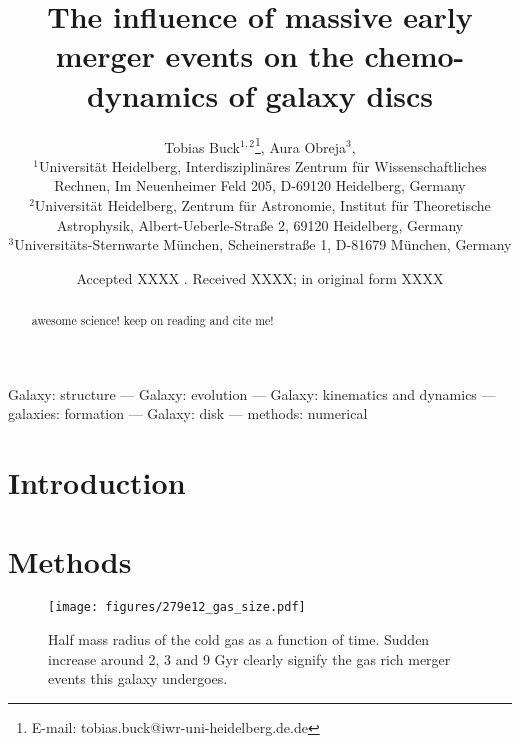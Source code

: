 \documentclass[useAMS,usenatbib]{mnras}
\title[Early massive accretion events in a MW-mass galaxy]{The influence of massive early merger events on the chemo-dynamics of galaxy discs}
\author[T. Buck] {Tobias Buck$^{1,2}$\thanks{E-mail: tobias.buck@iwr-uni-heidelberg.de.de}, Aura Obreja$^{3}$, \etal \\  %
%
$^1$Universit\"at Heidelberg, Interdisziplin\"ares Zentrum f\"ur Wissenschaftliches Rechnen, Im Neuenheimer Feld 205, D-69120 Heidelberg, Germany\\
$^2$Universit\"at Heidelberg, Zentrum f\"ur Astronomie, Institut f\"ur Theoretische Astrophysik, Albert-Ueberle-Straße 2, 69120 Heidelberg, Germany\\
$^3$Universit\"ats-Sternwarte M\"unchen, Scheinerstraße 1, D-81679 M\"unchen, Germany%
}
\begin{document}
\date{Accepted XXXX . Received XXXX; in original form XXXX}

\pagerange{\pageref{firstpage}--\pageref{lastpage}} 

\maketitle

\label{firstpage}


\begin{abstract}
awesome science! keep on reading and cite me! 
\end{abstract}

\noindent
\begin{keywords}

Galaxy: structure --- Galaxy: evolution --- Galaxy: kinematics and dynamics --- galaxies:
  formation --- Galaxy: disk --- methods: numerical
 \end{keywords}



\section{Introduction} \label{sec:introduction}



\section{Methods} \label{sec:simulation}

\begin{figure}
    \begin{centering}
        \texttt{[image: figures/279e12\_gas\_size.pdf]}
        \caption{
            Half mass radius of the cold gas as a function of time. Sudden increase around 2, 3 and 9 Gyr clearly signify the gas rich merger events this galaxy undergoes.
        }
        \label{fig:half_mass}
    \end{centering}
\end{figure}
\end{document}
